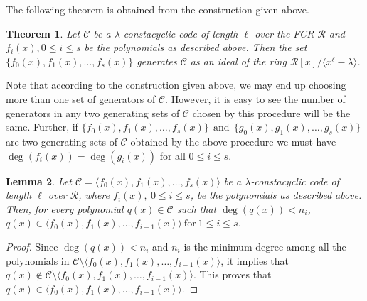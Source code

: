 \documentclass[12pt,a4paper]{article}
\newtheorem{theorem}{Theorem}[section]
\newtheorem{lemma}[theorem]{Lemma}
\begin{document}
The following theorem is obtained from the construction given above.
\begin{theorem}\label{thm:ccspanning}
    Let $\mathcal{C}$ be a $\lambda$-constacyclic code of length $\ell$ over the FCR $\mathcal{R}$ and $f_i(x), 0 \le i \le s$ be the polynomials as described above. Then the set $\{ f_0(x),f_1(x), \dots , f_s(x) \}$ generates  $\mathcal{C}$ as an ideal of the ring $\mathcal{R}[x]/ \langle x^{\ell}- \lambda \rangle$.
\end{theorem}

Note that according to the construction given above, we may end up choosing more than one set of generators of $\mathcal{C}$. However, it is easy to see  the number of generators in any two generating sets of $\mathcal{C}$ chosen by this procedure will be the same. Further, if $\{ f_0(x),f_1(x), \dots, f_s(x)\}~~\text{and}~~\{g_0(x),g_1(x), \dots, g_s(x)\}$ are two generating sets of $\mathcal{C}$ obtained by the above procedure we must have $\deg(f_i(x))=\deg(g_i(x))$ for all $0 \le i \le s$.

\begin{lemma}\label{lem:first}
    Let $\mathcal{C}=\langle f_0(x),f_1(x),\dots, f_s(x)\rangle$ be a $\lambda$-constacyclic code of length $\ell$ over $\mathcal{R}$, where $f_i(x),~0 \le i \le s$, be the polynomials as described above. Then, for every polynomial $q(x) \in \mathcal{C}$ such that $\deg(q(x))<n_i$, $q(x) \in \langle f_0(x),f_1(x), \dots, f_{i-1}(x) \rangle ~\text{for}~ 1 \le i \le s$.
\end{lemma}
\begin{proof}
    Since $\deg(q(x))<n_i$ and $n_i$ is the minimum degree among all the polynomials in $\mathcal{C} \setminus \langle f_0(x),f_1(x),\dots,f_{i-1}(x) \rangle$, it implies that $q(x) \notin \mathcal{C} \setminus \langle f_0(x),f_1(x),\dots,f_{i-1}(x) \rangle$. This proves that $q(x) \in \langle f_0(x),f_1(x),\dots,f_{i-1}(x) \rangle$.
\end{proof}
\end{document}

